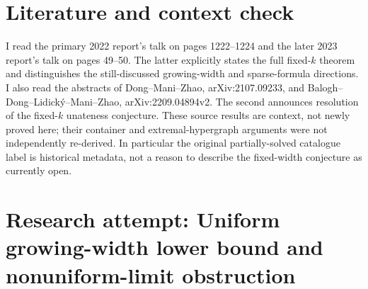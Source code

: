 \documentclass[11pt]{article}
\begin{document}
\section{Literature and context check}

I read the primary 2022 report's talk on pages 1222--1224 and the later 2023
report's talk on pages 49--50. The latter explicitly states the full fixed-$k$
theorem and distinguishes the still-discussed growing-width and sparse-formula
directions. I also read the abstracts of Dong--Mani--Zhao,
arXiv:2107.09233, and Balogh--Dong--Lidick\'y--Mani--Zhao,
arXiv:2209.04894v2. The second announces resolution of the fixed-$k$ unateness
conjecture. These source results are context, not newly proved here; their
container and extremal-hypergraph arguments were not independently re-derived.
In particular the original partially-solved catalogue label is historical metadata,
not a reason to describe the fixed-width conjecture as currently open.

\section{Research attempt: Uniform growing-width lower bound and nonuniform-limit obstruction}
\end{document}
